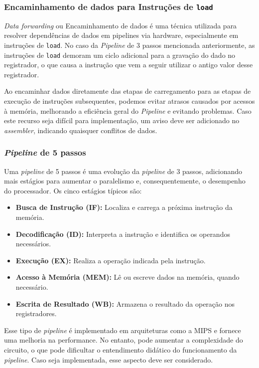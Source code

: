 \documentclass[
	12pt,				%
	openright,			%
	oneside,			%
	a4paper,			%
	english,			%
	french,				%
	spanish,			%
	brazil,				%
	]{abntex2}
\begin{document}
\subsubsection{Encaminhamento de dados para Instruções de \texttt{load}}\label{recursos_forward}%

\textit{Data forwarding} ou Encaminhamento de dados  é uma técnica utilizada para resolver dependências de dados em pipelines via hardware, especialmente em instruções de \texttt{load}. No caso da \textit{Pipeline} de 3 passos mencionada anteriormente, as instruções de \texttt{load} demoram um ciclo adicional para a gravação do dado no registrador, o que causa a instrução que vem a seguir utilizar o antigo valor desse registrador.

Ao encaminhar dados diretamente das etapas de carregamento para as etapas de execução de instruções subsequentes, podemos evitar atrasos causados por acessos à memória, melhorando a eficiência geral do \textit{Pipeline} e evitando problemas. Caso este recurso seja difícil para implementação, um aviso deve ser adicionado no \textit{assembler}, indicando quaisquer conflitos de dados.

\subsubsection{\textit{Pipeline} de 5 passos}\label{recursos_pipe5}%

Uma \textit{pipeline} de 5 passos é uma evolução da \textit{pipeline} de 3 passos, adicionando mais estágios para aumentar o paralelismo e, consequentemente, o desempenho do processador. Os cinco estágios típicos são:
\begin{itemize}
    \item \textbf{Busca de Instrução (IF):} Localiza e carrega a próxima instrução da memória.
    \item \textbf{Decodificação (ID):} Interpreta a instrução e identifica os operandos necessários.
    \item \textbf{Execução (EX):} Realiza a operação indicada pela instrução.
    \item \textbf{Acesso à Memória (MEM):} Lê ou escreve dados na memória, quando necessário.
    \item \textbf{Escrita de Resultado (WB):} Armazena o resultado da operação nos registradores.
\end{itemize}

Esse tipo de \textit{pipeline} é implementado em arquiteturas como a MIPS\cite{mips_tech_llc_mips32_2016} e fornece uma melhoria na performance. No entanto, pode aumentar a complexidade do circuito, o que pode dificultar o entendimento didático do funcionamento da \textit{pipeline}. Caso seja implementada, esse aspecto deve ser considerado.
\end{document}
